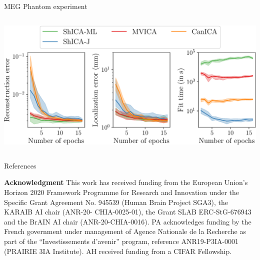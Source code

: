 \documentclass[final]{beamer}
\newlength{\onecolwid}
\newlength{\onecolwidthree}
\begin{document}
\begin{frame}[t]
\begin{columns}[t]
\begin{column}{\onecolwidthree}
\begin{block}{MEG Phantom experiment}
\begin{columns}
      \begin{column}{0.6 \textwidth}
    \begin{center}
      \includegraphics[width=1\textwidth]{./figures/meg_phantom_neurips.pdf}
    \end{center}
  \end{column}
    \end{columns}
  \end{block}




\vspace{-2em}
\begin{block}{References}
  \nocite{*} %
    \printbibliography
\end{block}


  \small{
    \textbf{Acknowledgment} This work has received funding from the European
    Union’s Horizon 2020 Framework Programme for Research and Innovation under the Specific
    Grant Agreement No. 945539 (Human Brain Project SGA3), the KARAIB AI chair (ANR-20-
    CHIA-0025-01), the Grant SLAB ERC-StG-676943 and the BrAIN AI chair (ANR-20-CHIA-0016).
    PA acknowledges funding by the French government under management of Agence Nationale
    de la Recherche as part of the “Investissements d’avenir” program, reference ANR19-P3IA-0001
    (PRAIRIE 3IA Institute). AH received funding from a CIFAR Fellowship.
  }



\end{column}
\end{columns}
\end{frame}
\end{document}
